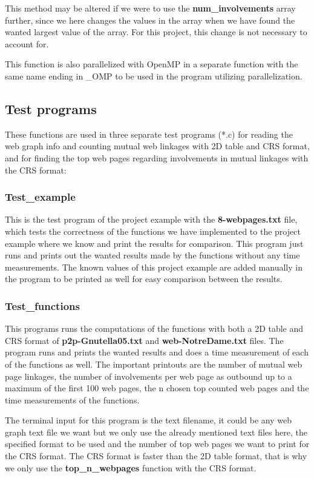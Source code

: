 \documentclass[12pt,a4paper,english]{article}
\begin{document}
This method may be altered if we were to use the \textbf{num\_involvements} array further, since we here changes the values in the array when we have found the wanted largest value of the array. For this project, this change is not necessary to account for.

This function is also parallelized with OpenMP in a separate function with the same name ending in \_OMP to be used in the program utilizing parallelization.

\subsection{Test programs}
\label{subsect:Test_prog}
These functions are used in three separate test programs (*.c) for reading the web graph info and counting mutual web linkages with 2D table and CRS format, and for finding the top web pages regarding involvements in mutual linkages with the CRS format:

\subsubsection{Test\_example}
This is the test program of the project example with the \textbf{8-webpages.txt} file, which tests the correctness of the functions we have implemented to the project example where we know and print the results for comparison. This program just runs and prints out the wanted results made by the functions without any time measurements. The known values of this project example are added manually in the program to be printed as well for easy comparison between the results. 

\subsubsection{Test\_functions}
This programs runs the computations of the functions with both a 2D table and CRS format of \textbf{p2p-Gnutella05.txt} and \textbf{web-NotreDame.txt} files. The program runs and prints the wanted results and does a time measurement of each of the functions as well. The important printouts are the number of mutual web page linkages, the number of involvements per web page as outbound up to a maximum of the first 100 web pages, the n chosen top counted web pages and the time measurements of the functions.

The terminal input for this program is the text filename, it could be any web graph text file we want but we only use the already mentioned text files here, the specified format to be used and the number of top web pages we want to print for the CRS format. The CRS format is faster than the 2D table format, that is why we only use the \textbf{top\_n\_webpages} function with the CRS format.
\end{document}
